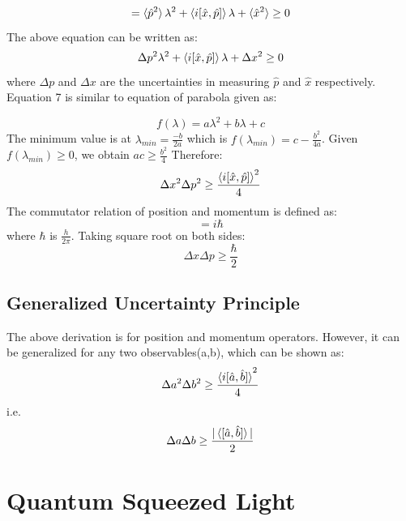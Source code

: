 \documentclass[conference]{IEEEtran}
\begin{document}
\begin{equation}
=\braket{\hat{p}^2}\lambda^2+\braket{i[\hat{x},\hat{p}]}\lambda+\braket{\hat{x}^2}\geq 0    
\end{equation}
The above equation can be written as:
\begin{equation}
\Delta p^2 \lambda^2 + \braket{i[\hat{x},\hat{p}]}\lambda + \Delta x^2 \geq 0    
\end{equation}
where $\Delta p$ and $\Delta x$ are the uncertainties in measuring $\hat{p}$ and $\hat{x}$ respectively. Equation 7 is similar to equation of parabola given as:

\begin{equation}
f(\lambda)=a\lambda^2 + b\lambda+c    
\end{equation}
The minimum value is at $\lambda_{min}=\frac{-b}{2a}$ which is $f(\lambda_{min})=c-\frac{b^2}{4a}$. Given $f(\lambda_{min}) \geq 0$, we obtain $ac\geq\frac{b^2}{4}$
Therefore:
\begin{equation}
\Delta x^2 \Delta p^2 \geq \frac{\braket{i[\hat{x},\hat{p}]}^2}{4}     
\end{equation}
The commutator relation of position and momentum is defined as: 
\begin{equation}
[\hat{x},\hat{p}]=i\hbar    
\end{equation}
where $\hbar$ is $\frac{h}{2\pi}$. Taking square root on both sides:
\begin{equation}
\Delta x \Delta p \geq \frac{\hbar}{2}    
\end{equation}

\subsection*{Generalized Uncertainty Principle}

The above derivation is for position and momentum operators. However, it can be generalized for any two observables(a,b), which can be shown as\cite{mmoore}:
\begin{equation}
\Delta a^2 \Delta b^2 \geq \frac{\braket{i[\hat{a},\hat{b}]}^2}{4}      
\end{equation}
i.e.
\begin{equation}
\Delta a \Delta b \geq \frac{|\braket{[\hat{a},\hat{b}]}|}{2}      
\end{equation}

\section{Quantum Squeezed Light}
\end{document}
